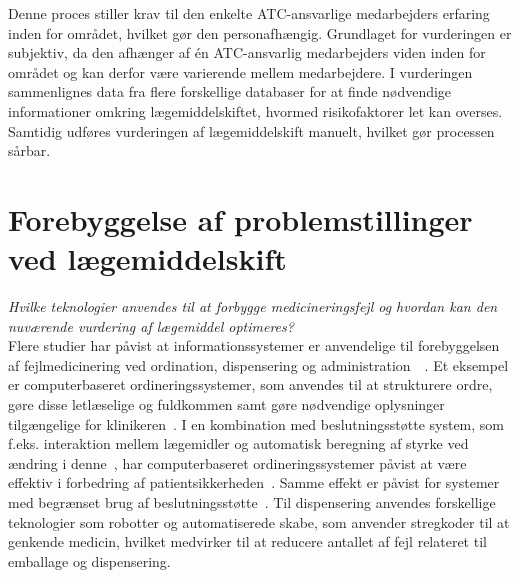 Denne proces stiller krav til den enkelte ATC-ansvarlige medarbejders erfaring inden for området, hvilket gør den personafhængig. Grundlaget for vurderingen er subjektiv, da den afhænger af én ATC-ansvarlig medarbejders viden inden for området og kan derfor være varierende mellem medarbejdere. I vurderingen sammenlignes data fra flere forskellige databaser for at finde nødvendige informationer omkring lægemiddelskiftet, hvormed risikofaktorer let kan overses. Samtidig udføres vurderingen af lægemiddelskift manuelt, hvilket gør processen sårbar.





\section{Forebyggelse af problemstillinger ved lægemiddelskift}
\textit{Hvilke teknologier anvendes til at forbygge medicineringsfejl og hvordan kan den nuværende vurdering af lægemiddel optimeres?} \\
Flere studier har påvist at informationssystemer er anvendelige til forebyggelsen af fejlmedicinering ved ordination, dispensering og administration~~\citep{Agrawal2009, Kaushal2002, Stenner2010, Fischer2008, Simpson2008, Bates2000a}. Et eksempel er computerbaseret ordineringssystemer, som anvendes til at strukturere ordre, gøre disse letlæselige og fuldkommen samt gøre nødvendige oplysninger tilgængelige for klinikeren~\citep{Agrawal2009,Bates2000a}. I en kombination med beslutningsstøtte system, som f.eks. interaktion mellem lægemidler og automatisk beregning af styrke ved ændring i denne~\citep{Agrawal2009}, har computerbaseret ordineringssystemer påvist at være effektiv i forbedring af patientsikkerheden~\citep{Agrawal2009, Bates2000a}. Samme effekt er påvist for systemer med begrænset brug af beslutningsstøtte~\citep{Bates2000a}. Til dispensering anvendes forskellige teknologier som robotter og automatiserede skabe, som anvender stregkoder til at genkende medicin, hvilket medvirker til at reducere antallet af fejl relateret til emballage og dispensering.~\citep{Agrawal2009}

